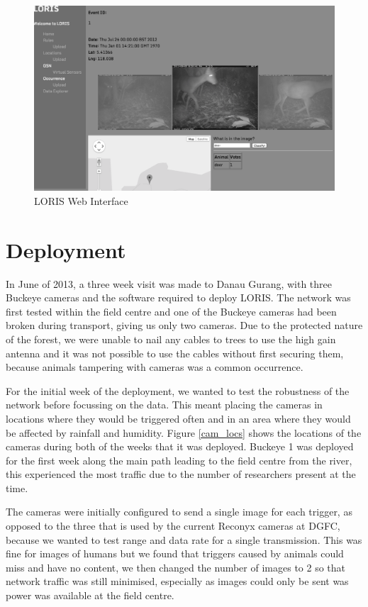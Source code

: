 				\begin{figure}[h]
				\centering
				\includegraphics[width=\textwidth]{Chap6/figures/loris}
				\caption{LORIS Web Interface}
				\label{fig:loris}
				\end{figure}
				
	\section{Deployment}\label{loris:dep}
		In June of 2013, a three week visit was made to Danau Gurang, with three Buckeye cameras and the software required to deploy LORIS. The network was first tested within the field centre and one of the Buckeye cameras had been broken during transport, giving us only two cameras. Due to the protected nature of the forest, we were unable to nail any cables to trees to use the high gain antenna and it was not possible to use the cables without first securing them, because animals tampering with cameras was a common occurrence.
		
		For the initial week of the deployment, we wanted to test the robustness of the network before focussing on the data. This meant placing the cameras in locations where they would be triggered often and in an area where they would be affected by rainfall and humidity. Figure \ref{cam_locs} shows the locations of the cameras during both of the weeks that it was deployed. Buckeye 1 was deployed for the first week along the main path leading to the field centre from the river, this experienced the most traffic due to the number of researchers present at the time. 

		The cameras were initially configured to send a single image for each trigger, as opposed to the three that is used by the current Reconyx cameras at DGFC, because we wanted to test range and data rate for a single transmission. This was fine for images of humans but we found that triggers caused by animals could miss and have no content, we then changed the number of images to 2 so that network traffic was still minimised, especially as images could only be sent was power was available at the field centre.
	
